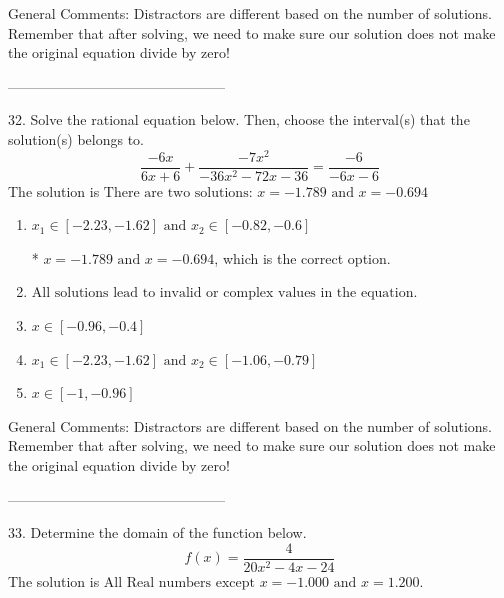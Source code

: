 \documentclass{article}[14pt]
\begin{document}
General Comments: Distractors are different based on the number of solutions. Remember that after solving, we need to make sure our solution does not make the original equation divide by zero!

-----------------------------------------------

32. Solve the rational equation below. Then, choose the interval(s) that the solution(s) belongs to.
$$ \frac{-6x}{6x + 6} + \frac{-7x^{2}}{-36x^{2} -72 x -36} = \frac{-6}{-6x -6} $$ 
The solution is $ \text{There are two solutions: } x = -1.789 \text{ and } x = -0.694 $ 

\begin{enumerate}[label=\Alph*.] 
\item $ x_1 \in [-2.23, -1.62] \text{ and } x_2 \in [-0.82,-0.6] $ 

 * $x = -1.789 \text{ and } x = -0.694$, which is the correct option. 
\item $ \text{All solutions lead to invalid or complex values in the equation.} $ 

  
\item $ x \in [-0.96,-0.4] $ 

  
\item $ x_1 \in [-2.23, -1.62] \text{ and } x_2 \in [-1.06,-0.79] $ 

  
\item $ x \in [-1,-0.96] $ 

  
\end{enumerate} 
 
General Comments: Distractors are different based on the number of solutions. Remember that after solving, we need to make sure our solution does not make the original equation divide by zero!

-----------------------------------------------

33. Determine the domain of the function below.
$$ f(x) = \frac{4}{20x^{2} -4 x -24} $$ 
The solution is $ \text{All Real numbers except } x = -1.000 \text{ and } x = 1.200. $ 
\end{document}
